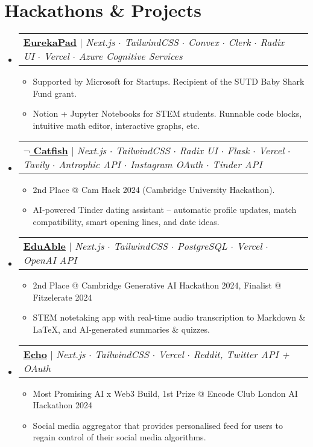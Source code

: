 \documentclass[letterpaper,10pt]{article}
\makeatletter
\newcommand{\link}[2]{\href{#1}{\color{blue}\underline{#2}}}
\newcommand{\resumeItem}[1]{
  \item\small{
    {#1 \vspace{-2pt}}
  }
}
\newcommand{\resumeProjectHeading}[2]{
  \item
  \begin{tabular*}{0.97\textwidth}{l@{\extracolsep{\fill}}r}
    \small#1 & #2 \\
  \end{tabular*}\vspace{-7pt}
}
\newenvironment{resumeSubHeadingList}{\begin{itemize}[leftmargin=0.15in, label={}]}{\end{itemize}}
\newenvironment{resumeItemList}{\begin{itemize}}{\end{itemize}}
\makeatother
\begin{document}
\section{Hackathons \& Projects}
\begin{resumeSubHeadingList}

  \resumeProjectHeading{
    \link{https://www.eurekapad.app/}{\textbf{EurekaPad}} $|$
    \emph{Next.js $\cdot$ TailwindCSS $\cdot$ Convex $\cdot$ Clerk $\cdot$
          Radix UI $\cdot$ Vercel $\cdot$ Azure Cognitive Services}}{}
  \begin{resumeItemList}
    \resumeItem{Supported by Microsoft for Startups. Recipient of the SUTD Baby
                Shark Fund grant. }
    \resumeItem{Notion + Jupyter Notebooks for STEM students. Runnable code
                blocks, intuitive math editor, interactive graphs, etc.}
  \end{resumeItemList}

  \resumeProjectHeading{
    \link{https://github.com/zeyu2001/camhack-frontend}{\textbf{$\lnot$
          Catfish}} $|$
    \emph{Next.js $\cdot$ TailwindCSS $\cdot$ Radix UI $\cdot$ Flask $\cdot$
          Vercel $\cdot$ Tavily $\cdot$ Antrophic API $\cdot$ Instagram OAuth
          $\cdot$ Tinder API}}{}
  \begin{resumeItemList}
    \resumeItem{2nd Place @ Cam Hack 2024 (Cambridge University Hackathon).}
    \resumeItem{AI-powered Tinder dating assistant -- automatic profile
                updates, match compatibility, smart opening lines, and date
                ideas.}
  \end{resumeItemList}

  \newpage

  \resumeProjectHeading{
    \link{https://github.com/zeyu2001/EduAble}{\textbf{EduAble}} $|$
    \emph{Next.js $\cdot$ TailwindCSS $\cdot$ PostgreSQL $\cdot$ Vercel $\cdot$
          OpenAI API}}{}
  \begin{resumeItemList}
    \resumeItem{2nd Place @ Cambridge Generative AI Hackathon 2024, Finalist @ Fitzelerate 2024}
    \resumeItem{STEM notetaking app with real-time audio transcription to
                Markdown \& LaTeX, and AI-generated summaries \& quizzes.}
  \end{resumeItemList}

  \resumeProjectHeading{
    \link{https://github.com/ECHO-LONDON/ECHO-Web}{\textbf{Echo}} $|$
    \emph{Next.js $\cdot$ TailwindCSS $\cdot$ Vercel $\cdot$ Reddit, Twitter
          API + OAuth}}{}
  \begin{resumeItemList}
    \resumeItem{Most Promising AI x Web3 Build, 1st Prize @ Encode Club London
                AI Hackathon 2024}
    \resumeItem{Social media aggregator that provides personalised feed for
                users to regain control of their social media algorithms.}
  \end{resumeItemList}


\end{resumeSubHeadingList}
\end{document}
